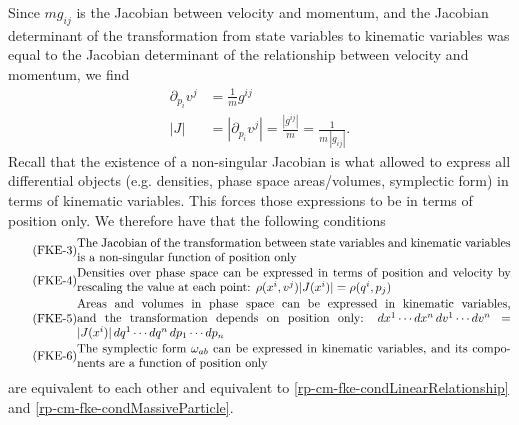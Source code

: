 Since $m g_{ij}$ is the Jacobian between velocity and momentum, and the Jacobian determinant of the transformation from state variables to kinematic variables was equal to the Jacobian determinant of the relationship between velocity and momentum, we find
\begin{equation}\label{rp-cm-fke-metricTensorDeterminantIsJacobianForDensities}
	\begin{aligned}
		\partial_{p_i} v^j &= \frac{1}{m}g^{ij} \\
		|J| &= |\partial_{p_i} v^j | = \frac{|g^{ij}|}{m} = \frac{1}{m \,|g_{ij}|}. 
	\end{aligned}
\end{equation}
Recall that the existence of a non-singular Jacobian is what allowed to express all differential objects (e.g. densities, phase space areas/volumes, symplectic form) in terms of kinematic variables. This forces those expressions to be in terms of position only. We therefore have that the following conditions
\begin{align}
	\tag{FKE-3}\label{rp-cm-fke-condJacobianOfPosition}
	&\parbox{5in}{The Jacobian of the transformation between state variables and kinematic variables is a non-singular function of position only} \\
	\tag{FKE-4}\label{rp-cm-fke-condDensitiesOfPosition}
	&\parbox{5in}{Densities over phase space can be expressed in terms of position and velocity by rescaling the value at each point: $\rho(x^i, v^j) |J(x^i)| = \rho(q^i, p_j)$} \\
	\tag{FKE-5}\label{rp-cm-fke-condAreasOfPosition}
	&\parbox{5in}{Areas and volumes in phase space can be expressed in kinematic variables, and the transformation depends on position only: $dx^1 \cdots dx^n \, dv^1 \cdots dv^n = |J(x^i)| \, dq^1 \cdots dq^n \, dp_1 \cdots dp_n$} \\
	\tag{FKE-6}\label{rp-cm-fke-condSymplecticOfPosition}
	&\parbox{5in}{The symplectic form $\omega_{ab}$ can be expressed in kinematic variables, and its components are a function of position only}
\end{align}
are equivalent to each other and equivalent to \ref{rp-cm-fke-condLinearRelationship} and \ref{rp-cm-fke-condMassiveParticle}.

